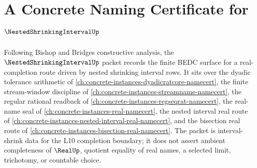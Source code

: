 \chapter{A Concrete Naming Certificate for $\NestedShrinkingIntervalUp$}
\label{ch:concrete-instances-nested-shrinking-interval-namecert}

Following Bishop and Bridges constructive analysis, the $\NestedShrinkingIntervalUp$ packet records the finite BEDC surface for a real-completion route driven by nested shrinking interval rows. It sits over the dyadic tolerance arithmetic of \autoref{ch:concrete-instances-dyadicratcore-namecert}, the finite stream-window discipline of \autoref{ch:concrete-instances-streamname-namecert}, the regular rational readback of \autoref{ch:concrete-instances-regseqrat-namecert}, the real-name seal of \autoref{ch:concrete-instances-real-namecert}, the nested interval real route of \autoref{ch:concrete-instances-nested-interval-real-namecert}, and the bisection real route of \autoref{ch:concrete-instances-bisection-real-namecert}. The packet is interval-shrink data for the L10 completion boundary; it does not assert ambient completeness of $\RealUp$, quotient equality of real names, a selected limit, trichotomy, or countable choice.


